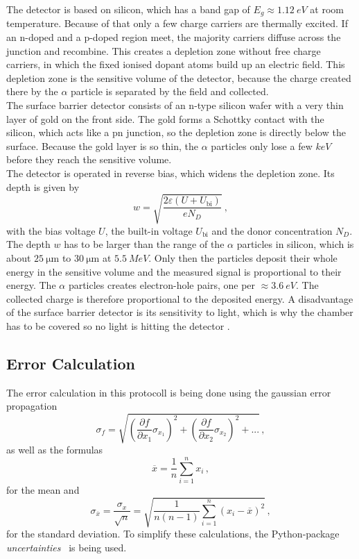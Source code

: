 The detector is based on silicon, which has a band gap of $E_g \approx \SI{1.12}{eV}$ at room temperature.
Because of that only a few charge carriers are thermally excited.
If an n-doped and a p-doped region meet, the majority carriers diffuse across the junction and recombine.
This creates a depletion zone without free charge carriers, in which the fixed ionised dopant atoms build up an electric field.
This depletion zone is the sensitive volume of the detector, because the charge created there by the $\alpha$ particle is separated by the field and collected.
\\
The surface barrier detector consists of an n-type silicon wafer with a very thin layer of gold on the front side.
The gold forms a Schottky contact with the silicon, which acts like a pn junction, so the depletion zone is directly below the surface.
Because the gold layer is so thin, the $\alpha$ particles only lose a few $\si{keV}$ before they reach the sensitive volume.
\\
The detector is operated in reverse bias, which widens the depletion zone.
Its depth is given by
\begin{equation}
    w = \sqrt{\frac{2\varepsilon\left(U + U_\text{bi}\right)}{e N_D}} \ ,
\end{equation}
with the bias voltage $U$, the built-in voltage $U_\text{bi}$ and the donor concentration $N_D$.
The depth $w$ has to be larger than the range of the $\alpha$ particles in silicon, which is about $\SI{25}{\micro\meter}$ to $\SI{30}{\micro\meter}$ at $\SI{5.5}{MeV}$.
Only then the particles deposit their whole energy in the sensitive volume and the measured signal is proportional to their energy.
The $\alpha$ particles creates electron-hole pairs, one per $\approx \SI{3.6}{eV}$. The collected charge is therefore proportional to the deposited energy.
A disadvantage of the surface barrier detector is its sensitivity to light, which is why the chamber has to be covered so no light is hitting the detector \cite{leo}.
\subsection{Error Calculation}
The error calculation in this protocoll is being done using the gaussian error propagation
\begin{equation}
    \sigma_f = \sqrt{\left( \frac{\partial f}{\partial x_1} \sigma_{x_1} \right)^2 + \left( \frac{\partial f}{\partial x_2} \sigma_{x_2} \right)^2 + ...} \, ,
\end{equation}
as well as the formulas 
\begin{equation}
    \overline{x} = \frac{1}{n} \sum^n_{i=1}x_i \, ,
    \label{eq:mittelwert}
\end{equation}
for the mean and 
\begin{equation}
    \sigma_{\overline{x}} = \frac{\sigma_x}{\sqrt{n}} = \sqrt{\frac{1}{n(n-1)}  \sum^n_{i=1} \left( x_i - \overline{x}\right)^2 } \, ,
    \label{eq:abweichung}
\end{equation}
for the standard deviation. 
To simplify these calculations, the Python-package \textit{uncertainties}~\cite{uncertainties} is being used. 

\clearpage